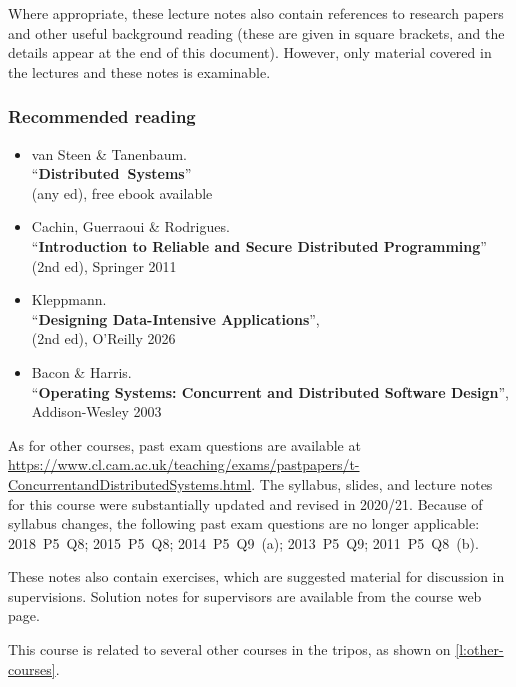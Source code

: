 Where appropriate, these lecture notes also contain references to research papers and other useful background reading (these are given in square brackets, and the details appear at the end of this document).
However, only material covered in the lectures and these notes is examinable.

\begin{frame}
    \label{s:reading}
    \frametitle{Recommended reading}
    \begin{itemize}
        \item van Steen \& Tanenbaum.\\ ``\textbf{Distributed Systems}''\\(any ed), free ebook available
        \item Cachin, Guerraoui \& Rodrigues. \\ ``\textbf{Introduction to Reliable and Secure Distributed Programming}'' (2nd ed), Springer 2011
		\item Kleppmann.\\ ``\textbf{Designing Data-Intensive Applications}'',\\(2nd ed), O’Reilly 2026
        \item Bacon \& Harris.\\ ``\textbf{Operating Systems: Concurrent and Distributed Software Design}'', Addison-Wesley 2003
    \end{itemize}
\end{frame}

As for other courses, past exam questions are available at \url{https://www.cl.cam.ac.uk/teaching/exams/pastpapers/t-ConcurrentandDistributedSystems.html}.
The syllabus, slides, and lecture notes for this course were substantially updated and revised in 2020/21.
Because of syllabus changes, the following past exam questions are no longer applicable: 2018~P5~Q8; 2015~P5~Q8; 2014~P5~Q9~(a); 2013~P5~Q9; 2011~P5~Q8~(b).

These notes also contain exercises, which are suggested material for discussion in supervisions.
Solution notes for supervisors are available from the course web page.

This course is related to several other courses in the tripos, as shown on \autoref{l:other-courses}.

